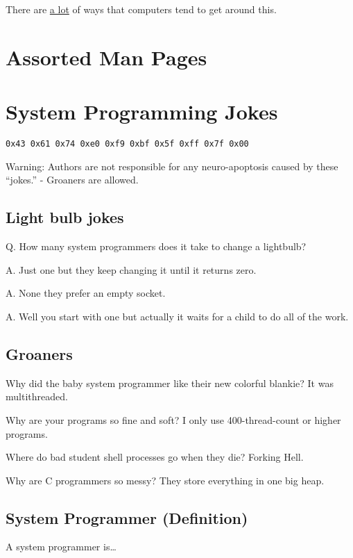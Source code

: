 There are \href{https://en.wikipedia.org/wiki/Stack_buffer_overflow}{a lot} of ways that computers tend to get around this.

\section{Assorted Man Pages}


\section{System Programming Jokes}

\texttt{0x43\ 0x61\ 0x74\ 0xe0\ 0xf9\ 0xbf\ 0x5f\ 0xff\ 0x7f\ 0x00}

Warning: Authors are not responsible for any neuro-apoptosis caused by these ``jokes.'' - Groaners are allowed.

\subsection{Light bulb jokes}

Q. How many system programmers does it take to change a lightbulb?

A. Just one but they keep changing it until it returns zero.

A. None they prefer an empty socket.

A. Well you start with one but actually it waits for a child to do all of the work.

\subsection{Groaners}

Why did the baby system programmer like their new colorful blankie? It was multithreaded.

Why are your programs so fine and soft? I only use 400-thread-count or higher programs.

Where do bad student shell processes go when they die? Forking Hell.

Why are C programmers so messy? They store everything in one big heap.

\subsection{System Programmer (Definition)}

A system programmer is\ldots{}

